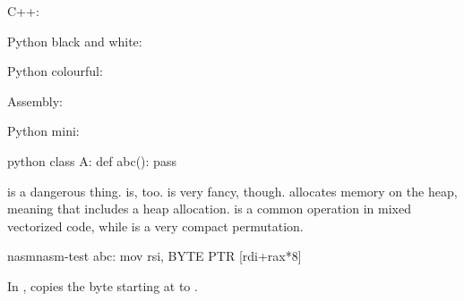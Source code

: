 \documentclass{article}
\begin{document}
C++:

Python black and white:

Python colourful:

Assembly:

Python mini:

\begin{SemCoMiniEnv}{python}
class A:
  def abc(): pass
\end{SemCoMiniEnv}

 is a dangerous thing.
 is, too.
 is very fancy, though.
 allocates memory on the heap, meaning that  includes a heap allocation.
 is a common operation in mixed vectorized code, while  is a very compact permutation.
\begin{SemCoAnalyzeEnv}{nasm}{nasm-test}
abc:
  mov rsi, BYTE PTR [rdi+rax*8]
\end{SemCoAnalyzeEnv}
In ,  copies the byte starting at  to .
\end{document}
